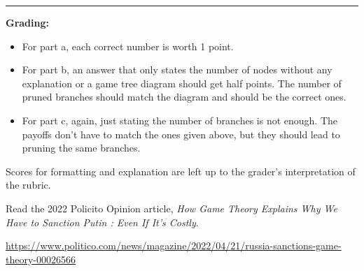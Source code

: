 \documentclass[addpoints]{exam}
\begin{document}
\begin{questions}
\begin{solution}
\begin{parts}
  \noindent\rule[0.5ex]{\linewidth}{1pt}
   
  \textbf{Grading:}

  \begin{itemize}
  \item 
  For part a, each correct number is worth 1 point.

  \item
  For part b, an answer that only states the number of nodes without any explanation or a game tree diagram 
  should get half points.
  The number of pruned branches should match the diagram and should be the correct ones.

  \item
  For part c, again, just stating the number of branches is not enough. 
  The payoffs don't have to match the ones given above, but they should lead to pruning the same branches. 
  
  \end{itemize}

  Scores for formatting and explanation are left up to the grader's interpretation of the rubric.

\end{parts}
\end{solution}

\newpage


\question%

Read the 2022 Policito Opinion article, 
\textit{How Game Theory Explains Why We Have to Sanction Putin : Even If It’s Costly}.

\url{https://www.politico.com/news/magazine/2022/04/21/russia-sanctions-game-theory-00026566}

\end{questions}
\end{document}
